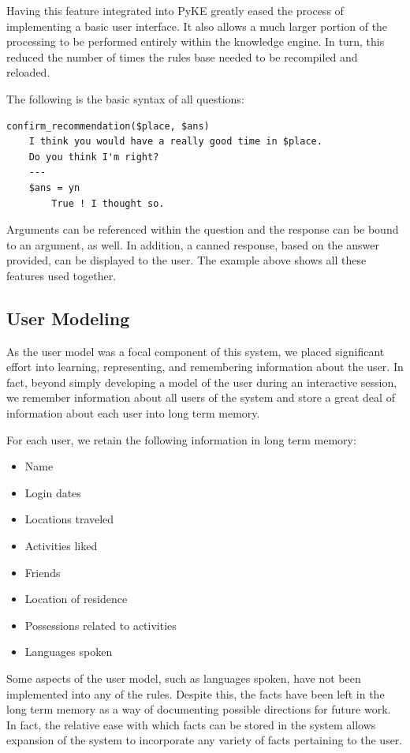 \documentclass[11pt]{article} %
\begin{document}
Having this feature integrated into PyKE greatly eased the process of implementing a basic user interface. It also allows a much larger portion of the processing to be performed entirely within the knowledge engine. In turn, this reduced the number of times the rules base needed to be recompiled and reloaded.

The following is the basic syntax of all questions:
\begin{Verbatim}[xleftmargin=2.5cm]
confirm_recommendation($place, $ans)
    I think you would have a really good time in $place.
    Do you think I'm right?
    ---
    $ans = yn
        True ! I thought so.
\end{Verbatim}

Arguments can be referenced within the question and the response can be bound to an argument, as well. In addition, a canned response, based on the answer provided, can be displayed to the user. The example above shows all these features used together.

\subsection{User Modeling}

As the user model was a focal component of this system, we placed significant effort into learning, representing, and remembering information about the user. In fact, beyond simply developing a model of the user during an interactive session, we remember information about all users of the system and store a great deal of information about each user into long term memory.

For each user, we retain the following information in long term memory:
\begin{multicols}{2}
\begin{itemize}
\setlength\itemsep{0em}
\item Name
\item Login dates
\item Locations traveled
\item Activities liked
\item Friends
\item Location of residence
\item Possessions related to activities
\item Languages spoken
\end{itemize}
\end{multicols}

Some aspects of the user model, such as languages spoken, have not been implemented into any of the rules. Despite this, the facts have been left in the long term memory as a way of documenting possible directions for future work. In fact, the relative ease with which facts can be stored in the system allows expansion of the system to incorporate any variety of facts pertaining to the user.
\end{document}
